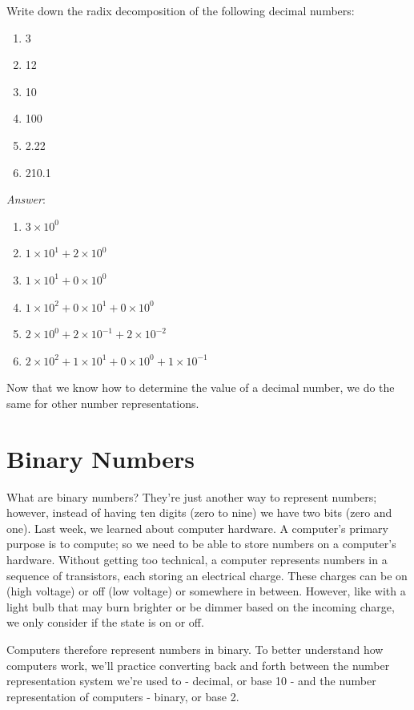 \begin{example}
Write down the radix decomposition of the following decimal numbers: 
\begin{enumerate}
\item 3
\item 12
\item 10
\item 100
\item 2.22
\item 210.1
\end{enumerate}
\noindent \emph{Answer}:
\begin{enumerate}
\item $3\times10^0$
\item $1\times10^1+2\times10^0$
\item $1\times10^1+0\times10^0$
\item $1\times10^2+0\times10^1+0\times10^0$
\item $2\times10^0+2\times10^{-1}+2\times10^{-2}$
\item $2\times10^2+1\times10^1+0\times10^0+1\times10^{-1}$
\end{enumerate}
\end{example}


Now that we know how to determine the value of a decimal number, we
do the same for other number representations. 

\section{Binary Numbers}
What are binary numbers? They’re just another way to represent numbers; however,
instead of having ten digits (zero to nine) we have two bits (zero and one). Last
week, we learned about computer hardware. A computer’s primary purpose is to
compute; so we need to be able to store numbers on a computer’s hardware. Without
getting too technical, a computer represents numbers in a sequence of transistors,
each storing an electrical charge. These charges can be on (high voltage) or off
(low voltage) or somewhere in between. However, like with a light bulb that may burn
brighter or be dimmer based on the incoming charge, we only consider if the state
is on or off. 

Computers therefore represent numbers in binary. To better understand how
computers work, we’ll practice converting back and forth between the number representation system we're used to - decimal, or base 10 - and the number representation of computers - binary, or base 2. 

